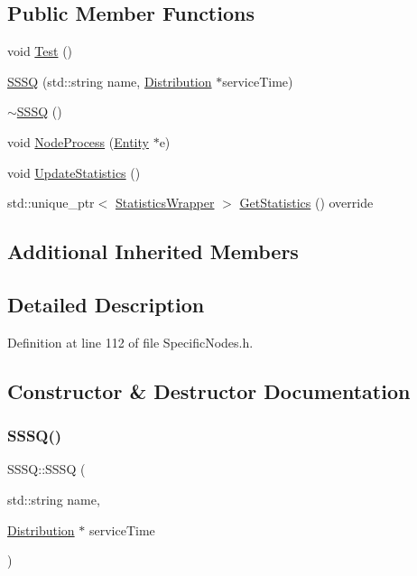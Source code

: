 \subsection*{Public Member Functions}
\begin{DoxyCompactItemize}
\item 
void \hyperlink{class_s_s_s_q_aad6abb8c7afcca47a7b567f9adfbf032}{Test} ()
\item 
\hyperlink{class_s_s_s_q_ab654407f52271f87971b0642dd61a543}{S\+S\+SQ} (std\+::string name, \hyperlink{class_distribution}{Distribution} $\ast$service\+Time)
\item 
\hyperlink{class_s_s_s_q_a6316b4f5b481609f244022cd83ef67bb}{$\sim$\+S\+S\+SQ} ()
\item 
void \hyperlink{class_s_s_s_q_a21ff1a4817052985747b6df51bf5d643}{Node\+Process} (\hyperlink{class_entity}{Entity} $\ast$e)
\item 
void \hyperlink{class_s_s_s_q_a8d3666772548e12aa39484d22ab5635c}{Update\+Statistics} ()
\item 
std\+::unique\+\_\+ptr$<$ \hyperlink{class_generic_node_1_1_statistics_wrapper}{Statistics\+Wrapper} $>$ \hyperlink{class_s_s_s_q_ad8f307b8a4609d28efcc122dddfe5120}{Get\+Statistics} () override
\end{DoxyCompactItemize}
\subsection*{Additional Inherited Members}


\subsection{Detailed Description}


Definition at line 112 of file Specific\+Nodes.\+h.



\subsection{Constructor \& Destructor Documentation}
\mbox{\label{class_s_s_s_q_ab654407f52271f87971b0642dd61a543}} 
\subsubsection{\texorpdfstring{S\+S\+S\+Q()}{SSSQ()}}
{\footnotesize\ttfamily S\+S\+S\+Q\+::\+S\+S\+SQ (\begin{DoxyParamCaption}\item[{std\+::string}]{name,  }\item[{\hyperlink{class_distribution}{Distribution} $\ast$}]{service\+Time }\end{DoxyParamCaption})}



